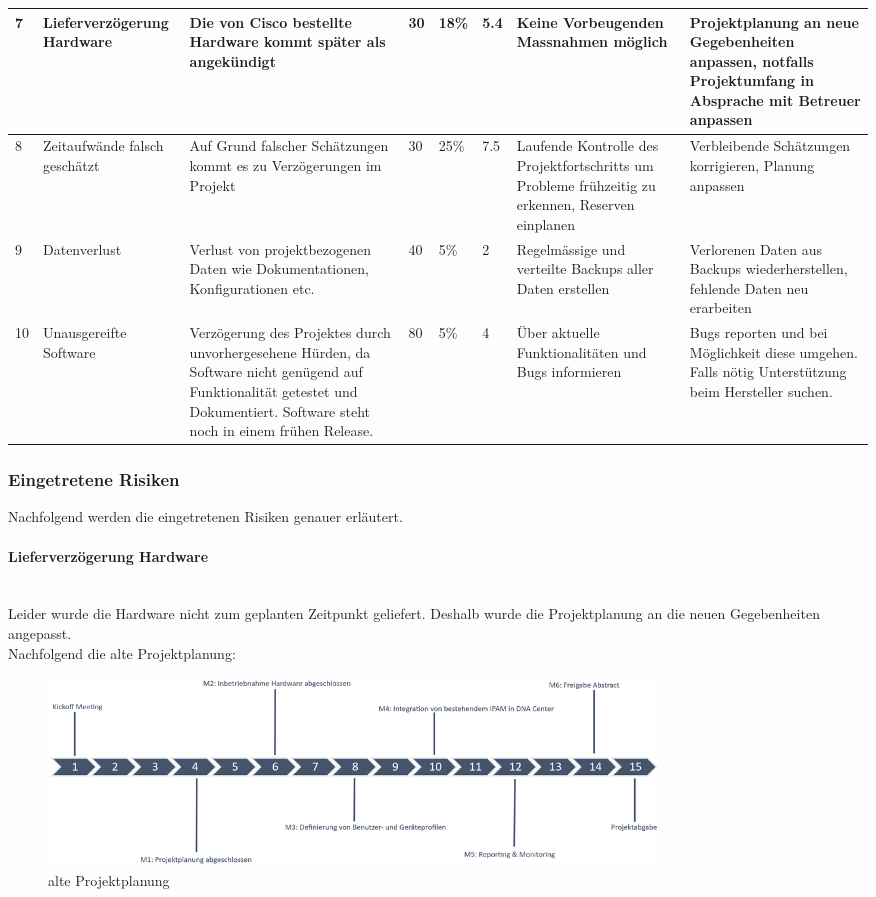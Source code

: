\begin{landscape}
\begin{longtable}{|m{0.5cm}|m{3cm}|m{5cm}|m{0.75cm}|m{0.75cm}|m{0.75cm}|m{5cm}|m{5cm}|}
	\hline
	7 & Lieferverzögerung Hardware & Die von Cisco bestellte Hardware kommt später als angekündigt & 30 & 18\% & 5.4 & Keine Vorbeugenden Massnahmen möglich & Projektplanung an neue Gegebenheiten anpassen, notfalls Projektumfang in Absprache mit Betreuer anpassen \\
	\hline
	8 & Zeitaufwände falsch geschätzt & Auf Grund falscher Schätzungen kommt es zu Verzögerungen im Projekt & 30 & 25\% & 7.5 & Laufende Kontrolle des Projektfortschritts um Probleme frühzeitig zu erkennen, Reserven einplanen & Verbleibende Schätzungen korrigieren, Planung anpassen \\
	\hline
	9 & Datenverlust & Verlust von projektbezogenen Daten wie Dokumentationen, Konfigurationen etc. & 40 & 5\% & 2 & Regelmässige und verteilte Backups aller Daten erstellen & Verlorenen Daten aus Backups wiederherstellen, fehlende Daten neu erarbeiten \\
	\hline
	10 & Unausgereifte Software & Verzögerung des Projektes durch unvorhergesehene Hürden, da Software nicht genügend auf Funktionalität getestet und Dokumentiert. Software steht noch in einem frühen Release. & 80 & 5\% & 4 & Über aktuelle Funktionalitäten und Bugs informieren & Bugs reporten und bei Möglichkeit diese umgehen. Falls nötig Unterstützung beim Hersteller suchen. \\
	\hline
\end{longtable}

\end{landscape}



\subsubsection{Eingetretene Risiken}
Nachfolgend werden die eingetretenen Risiken genauer erläutert.
\paragraph{Lieferverzögerung Hardware}
~\\
Leider wurde die Hardware nicht zum geplanten Zeitpunkt geliefert. Deshalb wurde die Projektplanung an die neuen Gegebenheiten angepasst. \\
Nachfolgend die alte Projektplanung:
\begin{figure}[H]
	\centering
	\includegraphics[height=5cm]{img/ZeitlichePlanung_v1.png}
	\caption{alte Projektplanung}
	\label{fig:alte Projektplanung}
\end{figure} 

